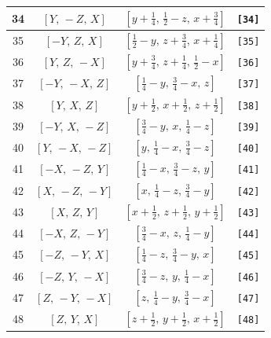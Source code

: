 \documentclass[fleqn,8pt]{jsarticle}
\begin{document}
\begin{longtable}{cccc}
34 & $\left[ Y,\, - Z,\, X \right]$ & $\left[ y + \frac{1}{4},\, \frac{1}{2} - z,\, x + \frac{3}{4} \right]$ & {\tt [34]} \\ \hline
35 & $\left[ - Y,\, Z,\, X \right]$ & $\left[ \frac{1}{2} - y,\, z + \frac{3}{4},\, x + \frac{1}{4} \right]$ & {\tt [35]} \\ \hline
36 & $\left[ Y,\, Z,\, - X \right]$ & $\left[ y + \frac{3}{4},\, z + \frac{1}{4},\, \frac{1}{2} - x \right]$ & {\tt [36]} \\ \hline
37 & $\left[ - Y,\, - X,\, Z \right]$ & $\left[ \frac{1}{4} - y,\, \frac{3}{4} - x,\, z \right]$ & {\tt [37]} \\ \hline
38 & $\left[ Y,\, X,\, Z \right]$ & $\left[ y + \frac{1}{2},\, x + \frac{1}{2},\, z + \frac{1}{2} \right]$ & {\tt [38]} \\ \hline
39 & $\left[ - Y,\, X,\, - Z \right]$ & $\left[ \frac{3}{4} - y,\, x,\, \frac{1}{4} - z \right]$ & {\tt [39]} \\ \hline
40 & $\left[ Y,\, - X,\, - Z \right]$ & $\left[ y,\, \frac{1}{4} - x,\, \frac{3}{4} - z \right]$ & {\tt [40]} \\ \hline
41 & $\left[ - X,\, - Z,\, Y \right]$ & $\left[ \frac{1}{4} - x,\, \frac{3}{4} - z,\, y \right]$ & {\tt [41]} \\ \hline
42 & $\left[ X,\, - Z,\, - Y \right]$ & $\left[ x,\, \frac{1}{4} - z,\, \frac{3}{4} - y \right]$ & {\tt [42]} \\ \hline
43 & $\left[ X,\, Z,\, Y \right]$ & $\left[ x + \frac{1}{2},\, z + \frac{1}{2},\, y + \frac{1}{2} \right]$ & {\tt [43]} \\ \hline
44 & $\left[ - X,\, Z,\, - Y \right]$ & $\left[ \frac{3}{4} - x,\, z,\, \frac{1}{4} - y \right]$ & {\tt [44]} \\ \hline
45 & $\left[ - Z,\, - Y,\, X \right]$ & $\left[ \frac{1}{4} - z,\, \frac{3}{4} - y,\, x \right]$ & {\tt [45]} \\ \hline
46 & $\left[ - Z,\, Y,\, - X \right]$ & $\left[ \frac{3}{4} - z,\, y,\, \frac{1}{4} - x \right]$ & {\tt [46]} \\ \hline
47 & $\left[ Z,\, - Y,\, - X \right]$ & $\left[ z,\, \frac{1}{4} - y,\, \frac{3}{4} - x \right]$ & {\tt [47]} \\ \hline
48 & $\left[ Z,\, Y,\, X \right]$ & $\left[ z + \frac{1}{2},\, y + \frac{1}{2},\, x + \frac{1}{2} \right]$ & {\tt [48]} \\
\end{longtable}
\end{document}
